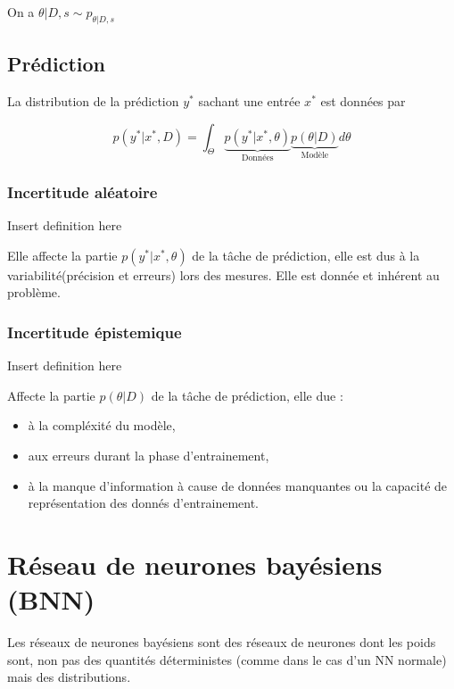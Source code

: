 \documentclass[french,12pt]{article}
\begin{document}
On a $\theta | D,s \sim p_{\theta | D, s}$

\subsection{Prédiction}

La distribution de la prédiction $y^*$ sachant une entrée $x^*$ est données par

$$ p(y^* | x^*, D) = \int_{\Theta} \underbrace{p(y^* | x^*, \theta)}_{\text{Données}} \underbrace{p(\theta  | D)}_{\text{Modèle}} d \theta$$

\subsubsection{Incertitude aléatoire}

Insert definition here

Elle affecte la partie $p(y^* | x^*, \theta)$ de la tâche de prédiction,
elle est dus à la variabilité(précision et erreurs) lors des mesures.
Elle est donnée et inhérent au problème.

\subsubsection{Incertitude épistemique}

Insert definition here

Affecte la partie $p(\theta  | D)$ de la tâche de prédiction,
elle due :

\begin{itemize}
    \item à la compléxité du modèle,
    \item aux erreurs durant la phase d'entrainement,
    \item à la manque d'information à cause de données manquantes
          ou la capacité de représentation des donnés d'entrainement.
\end{itemize}

\pagebreak

\section{Réseau de neurones bayésiens (BNN)}


Les réseaux de neurones bayésiens sont des réseaux de neurones
dont les poids sont, non pas des quantités déterministes (comme
dans le cas d'un NN normale) mais des distributions.
\end{document}
